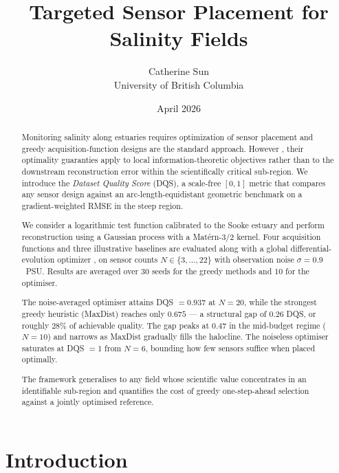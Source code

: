 \documentclass[11pt,letterpaper]{article}
\title{\bfseries Targeted Sensor Placement
for Salinity Fields}
\author{
  Catherine Sun \\
  \small University of British Columbia \\
}
\date{April 2026}
\begin{document}
\maketitle

\begin{abstract}
\noindent
Monitoring salinity along estuaries requires optimization of sensor placement and greedy
acquisition-function designs are the standard approach. However
, their optimality guaranties apply to local information-theoretic
objectives rather than to the downstream reconstruction error within
the scientifically critical sub-region. We introduce the \emph{Dataset
Quality Score} (DQS), a scale-free $[0,1]$ metric that compares any
sensor design against an arc-length-equidistant geometric benchmark
on a gradient-weighted RMSE in the steep region.

We consider a logarithmic test function calibrated to the Sooke
estuary and perform reconstruction using a Gaussian process with a
Mat\'ern-3/2 kernel. Four acquisition functions and three illustrative
baselines are evaluated along with a global differential-evolution optimizer
, on sensor counts $N \in \{3, \dots, 22\}$ with
observation noise $\sigma = 0.9$~PSU. Results are averaged over 30
seeds for the greedy methods and 10 for the optimiser.

The noise-averaged optimiser attains DQS $= 0.937$ at $N = 20$, while
the strongest greedy heuristic (MaxDist) reaches only $0.675$ --- a
structural gap of $0.26$ DQS, or roughly $28\%$ of achievable quality.
The gap peaks at $0.47$ in the mid-budget regime ($N = 10$) and
narrows as MaxDist gradually fills the halocline. The noiseless
optimiser saturates at DQS $= 1$ from $N = 6$, bounding how few
sensors suffice when placed optimally.

The framework generalises to any field whose scientific value
concentrates in an identifiable sub-region and quantifies the cost
of greedy one-step-ahead selection against a jointly optimised
reference.
\end{abstract}

\vspace{4pt}

\newpage
\section{Introduction}
\label{sec:intro}
\end{document}
